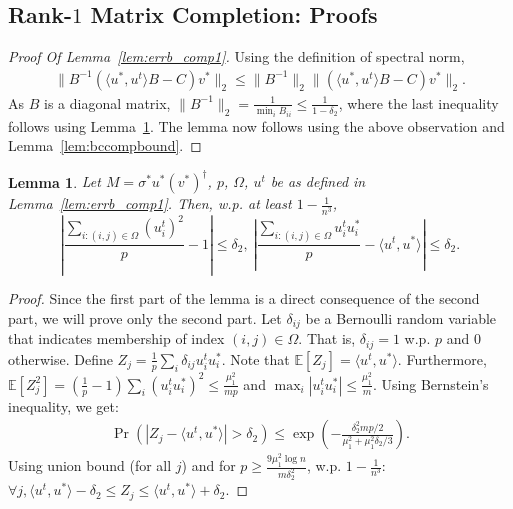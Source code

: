 \documentclass[11pt]{article}
\renewcommand{\eqref}[1]{\hyperref[#1]{(\ref*{#1})}}
\theoremstyle{plain}
\newtheorem{lemma}[theorem]{Lemma}
\theoremstyle{definition}
\newcommand{\so}{\sigma^*}
\newcommand{\ut}{u^t}
\newcommand{\uo}{u^* }
\newcommand{\vo}{v^* }
\newcommand{\ip}[2]{\langle #1, #2 \rangle}
\begin{document}
\subsection{Rank-$1$ Matrix Completion: Proofs}\label{app:rank1_comp}
\begin{proof}[Proof Of Lemma~\ref{lem:errb_comp1}]
Using the definition of spectral norm, 
\begin{align*}
  \|B^{-1}\left(\ip{\uo}{\ut}B-C\right)\vo\|_2\leq \|B^{-1}\|_2\|(\ip{\uo}{\ut}B-C)\vo\|_2.%
\end{align*}
As $B$ is a diagonal matrix, $\|B^{-1}\|_2= \frac{1}{\min_iB_{ii}}\leq \frac{1}{1-\delta_2}$, where the last inequality follows using Lemma~\ref{lem:errb_comp2}. The lemma now follows using the above observation and Lemma~\ref{lem:bccompbound}.%
\end{proof}
\begin{lemma}\label{lem:errb_comp2}
Let $M=\so\uo(\vo)^\dag$, $p$, $\Omega$, $\ut$ be as defined in Lemma~\ref{lem:errb_comp1}. 
Then, w.p. at least $1-\frac{1}{n^3}$,
$$\left|\frac{\sum_{i:(i,j)\in \Omega} (\ut_i)^2}{p}-1\right| \leq \delta_2,\ \left|\frac{\sum_{i:(i,j)\in \Omega} \ut_i \uo_i}{p}-\ip{\ut}{\uo}\right|\leq \delta_2.$$ %
\end{lemma}
\begin{proof}
Since the first part of the lemma is a direct consequence of the second part, we will prove only the second part.
Let $\delta_{ij}$ be a Bernoulli random variable that indicates membership of index $(i,j)\in \Omega$. That is, $\delta_{ij}=1$ w.p. $p$ and $0$ otherwise. Define $Z_j=\frac{1}{p}\sum_{i} \delta_{ij} \ut_i \uo_i$. Note that $\mathbb{E}[Z_j]=\ip{\ut}{\uo}$. Furthermore, $\mathbb{E}[Z_j^2]=\left(\frac{1}{p}-1\right)\sum_{i}(\ut_i \uo_i)^2\leq \frac{\mu_1^2}{mp}$ and $\max_i |\ut_i \uo_i|\leq \frac{\mu_1^2}{m}$. Using Bernstein's inequality, we get:  
\begin{align}
  \Pr(\left|Z_j-\ip{\ut}{\uo}\right|>\delta_2)\leq \exp\left(-\frac{\delta_2^2mp/2}{\mu_1^2+\mu_1^2\delta_2/3}\right). 
\end{align}
Using union bound (for all $j$) and for $p\geq \frac{9\mu_1^2\log n}{m\delta_2^2}$, w.p. $1-\frac{1}{n^3}$: $\forall j, \ip{\ut}{\uo}-\delta_2\leq Z_j \leq \ip{\ut}{\uo}+\delta_2$.
\end{proof}
\end{document}
